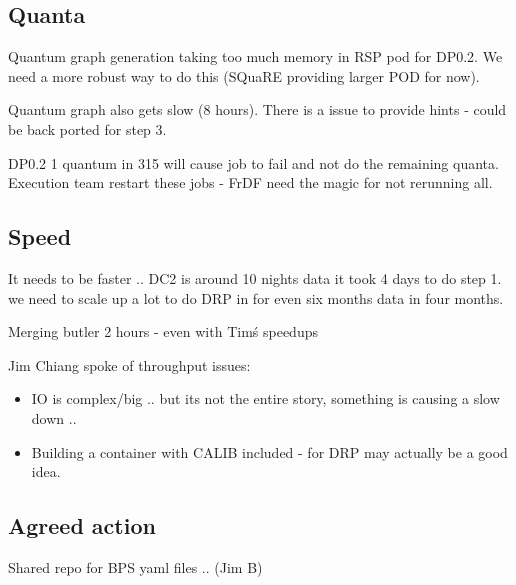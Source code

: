 \subsection{Quanta}
Quantum graph generation taking too much memory in RSP pod for DP0.2.
We need a more robust way to do this (SQuaRE providing larger POD for now).

Quantum graph also gets slow (8 hours).
There is a issue to provide hints - could be back ported for step 3.

DP0.2 1 quantum in 315 will cause job to fail and not do the remaining quanta.
Execution team restart these jobs - FrDF need the magic for not rerunning all.

\subsection {Speed}
It needs to be faster .. DC2 is around 10 nights data  it took 4 days to do step 1.
we need to scale up a lot to do DRP in for even six months data in four months.

Merging butler 2 hours - even with Tim\'s speedups

Jim Chiang spoke of throughput issues:
\begin{itemize}
\item IO is complex/big .. but its not the entire story, something is causing a slow down ..
\item Building a container with CALIB included - for DRP may actually be a good idea.
\end{itemize}

\subsection {Agreed action }

Shared repo for BPS yaml files ..  (Jim B)

